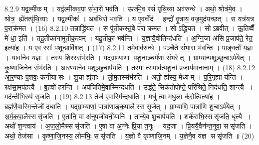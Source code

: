 8.2.9
यद्व॒ल्मीकम् । यद्व॑ल्मीकव॒पा सं॑भा॒रो भव॑ति । ऊर्ज॑मे॒व रसं॑ पृथि॒व्या अव॑रुन्धे । अथो॒ श्रोत्र॑मे॒व । श्रोत्र॒ ह्ये॑तत्पृ॑थि॒व्याः । यद्व॒ल्मीकः॑ । अब॑धिरो भवति । य ए॒वव्वेँद॑ । इन्द्रो॑ वृ॒त्राय॒ वज्र॒मुद॑यच्छत् । स यत्र॑यत्र प॒राक्र॑मत । (16)
8.2.10
तन्नाद्ध्रि॑यत । स पू॑तीकस्तं॒बे पराक्रमत । सोऽद्ध्रियत । सोऽब्रवीत् । ऊ॒तिव्वैँ मे॑ धा॒ इति॑ । तदू॒तीका॑नामूतीक॒त्वम् । यदू॒तीका॒ भव॑न्ति । य॒ज्ञायै॒वोतिन्द॑धति । अ॒ग्नि॒जा अ॑सि प्र॒जाप॑ते॒ रेत॒ इत्या॑ह । य ए॒व रसः॑ प॒शून्प्रावि॑शत् । (17)
8.2.11
तमे॒वाव॑रुन्धे । पञ्चै॒ते सं॑भा॒रा भ॑वन्ति । पाङ्क्तो॑ य॒ज्ञः । यावा॑ने॒व य॒ज्ञः । तस्य॒ शिर॒स्संभ॑रति । यद्ग्रा॒म्याणां पशू॒नाञ्चर्म॑णा सं॒भरेत् । ग्रा॒म्यान्प॒शूञ्छु॒चाऽर्प॑येत् । कृ॒ष्णा॒जि॒नेन॒ संभ॑रति । आ॒र॒ण्याने॒व प॒शूञ्छु॒चार्प॑यति । तस्मात्स॒माव॑त्पशू॒नां प्र॒जाय॑मानानाम् । (18)
8.2.12
आ॒र॒ण्याः प॒शवः॒ कनी॑यासः । शु॒चा ह्यृ॑ताः । लो॒म॒तस्संभ॑रति । अतो॒ ह्य॑स्य॒ मेध्यम् । प॒रि॒गृह्या य॑न्ति । रक्ष॑सा॒मप॑हत्यै । ब॒हवो॑ हरन्ति । अप॑चितिमे॒वास्मि॑न्दधति । उद्ध॑ते॒ सिक॑तोपोप्ते॒ परि॑श्रिते॒ निद॑धति॒ शान्त्यै । मद॑न्तीभि॒रुप॑ सृजति । (19)
8.2.13
तेज॑ ए॒वास्मि॑न्दधाति । मधु॑ त्वा मधु॒ला क॑रो॒त्वित्या॑ह । ब्रह्म॑णै॒वास्मि॒न्तेजो॑ दधाति । यद्ग्रा॒म्याणां॒ पात्रा॑णाङ्क॒पालैस्ससृ॒जेत् । ग्रा॒म्याणि॒ पात्रा॑णि शु॒चाऽर्प॑येत् । अ॒र्म॒क॒पा॒लैस्ससृ॑जति । ए॒तानि॒ वा अ॑नुपजीवनी॒यानि॑ । तान्ये॒व शु॒चार्प॑यति । शर्क॑राभि॒स्ससृ॑जति॒ धृत्यै । अथो॑ श॒न्त्वाय॑ । अ॒ज॒लो॒मैस्ससृ॑जति । ए॒षा वा अ॒ग्नेः प्रि॒या त॒नूः । यद॒जा । प्रि॒ययै॒वैन॑न्त॒नुवा॒ ससृ॑जति । अथो॒ तेज॑सा । कृ॒ष्णा॒जि॒नस्य॒ लोम॑भिः॒ ससृ॑जति । य॒ज्ञो वै कृ॑ष्णाजि॒नम् । य॒ज्ञेनै॒व यज्ञ ससृ॑जति ॥ (20)
\anuvakamend


